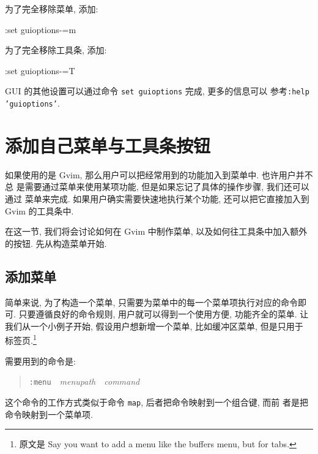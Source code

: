 \begin{warning}
为了完全移除菜单, 添加:
\begin{vimcmd}
:set guioptions-=m
\end{vimcmd}

为了完全移除工具条, 添加:
\begin{vimcmd}
:set guioptions-=T
\end{vimcmd}

\begin{warning}
    GUI 的其他设置可以通过命令 \texttt{set guioptions} 完成, 更多的信息可以
    参考\texttt{:help 'guioptions'}.
\end{warning}

\section{添加自己菜单与工具条按钮}
\label{sec:adding_your_own_menu_and_toolbar_buttons}
如果使用的是 Gvim, 那么用户可以把经常用到的功能加入到菜单中. 也许用户并不总
是需要通过菜单来使用某项功能, 但是如果忘记了具体的操作步骤, 我们还可以通过
菜单来完成. 如果用户确实需要快速地执行某个功能, 还可以把它直接加入到 Gvim
的工具条中.

在这一节, 我们将会讨论如何在 Gvim 中制作菜单, 以及如何往工具条中加入额外
的按钮. 先从构造菜单开始.

\subsection{添加菜单}
\label{subsec:adding_a_menu}
简单来说, 为了构造一个菜单, 只需要为菜单中的每一个菜单项执行对应的命令即可.
只要遵循良好的命令规则, 用户就可以得到一个使用方便, 功能齐全的菜单.
让我们从一个小例子开始, 假设用户想新增一个菜单, 比如缓冲区菜单, 但是只用于
标签页.\footnote{ 原文是 Say you want to add a menu like the buffers menu,
but for tabs.}

\begin{center}
\end{center}

需要用到的命令是:
\begin{quotation}
\texttt{:menu}\ \ \textit{menupath}\ \ \textit{command}
\end{quotation}
这个命令的工作方式类似于命令 \texttt{map}, 后者把命令映射到一个组合键, 而前
者是把命令映射到一个菜单项.


\end{warning}
